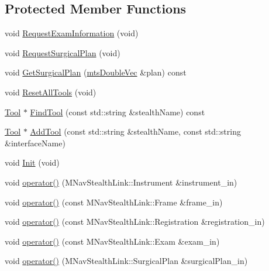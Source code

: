 \subsection*{Protected Member Functions}
\begin{DoxyCompactItemize}
\item 
void \hyperlink{classmts_medtronic_stealthlink_ae06f8fd7e621ea1402a751d335a94769}{Request\+Exam\+Information} (void)
\item 
void \hyperlink{classmts_medtronic_stealthlink_a44ff78af55d1dafdf41baaf3657ebc24}{Request\+Surgical\+Plan} (void)
\item 
void \hyperlink{classmts_medtronic_stealthlink_ae60211f430f60cd11a37156a53eaa1dc}{Get\+Surgical\+Plan} (\hyperlink{mts_vector_8h_af69167a5dc2ad33eb93965b9387d8403}{mts\+Double\+Vec} \&plan) const 
\item 
void \hyperlink{classmts_medtronic_stealthlink_ad4b03cca497d5cbb450a1cef93ac64d7}{Reset\+All\+Tools} (void)
\item 
\hyperlink{classmts_medtronic_stealthlink_1_1_tool}{Tool} $\ast$ \hyperlink{classmts_medtronic_stealthlink_a183ea588664bf2850dc56405c7bea2bb}{Find\+Tool} (const std\+::string \&stealth\+Name) const 
\item 
\hyperlink{classmts_medtronic_stealthlink_1_1_tool}{Tool} $\ast$ \hyperlink{classmts_medtronic_stealthlink_a6f4b088bb06ecdb655e26c79f0612b25}{Add\+Tool} (const std\+::string \&stealth\+Name, const std\+::string \&interface\+Name)
\item 
void \hyperlink{classmts_medtronic_stealthlink_a8ff47edf8d1292a5c2ecee33a49b9923}{Init} (void)
\item 
void \hyperlink{classmts_medtronic_stealthlink_ab812b32d819a83e3d5b3c04749a71efd}{operator()} (M\+Nav\+Stealth\+Link\+::\+Instrument \&instrument\+\_\+in)
\item 
void \hyperlink{classmts_medtronic_stealthlink_a6a6352f68c6541b906923c8aec4560b5}{operator()} (const M\+Nav\+Stealth\+Link\+::\+Frame \&frame\+\_\+in)
\item 
void \hyperlink{classmts_medtronic_stealthlink_acdb93302db9bc6125a2b34bb49133ff5}{operator()} (const M\+Nav\+Stealth\+Link\+::\+Registration \&registration\+\_\+in)
\item 
void \hyperlink{classmts_medtronic_stealthlink_adff332df7664519d1f219224ae3a51b6}{operator()} (const M\+Nav\+Stealth\+Link\+::\+Exam \&exam\+\_\+in)
\item 
void \hyperlink{classmts_medtronic_stealthlink_a90f4d5213489fc6738c3a237fd32719b}{operator()} (M\+Nav\+Stealth\+Link\+::\+Surgical\+Plan \&surgical\+Plan\+\_\+in)
\end{DoxyCompactItemize}
